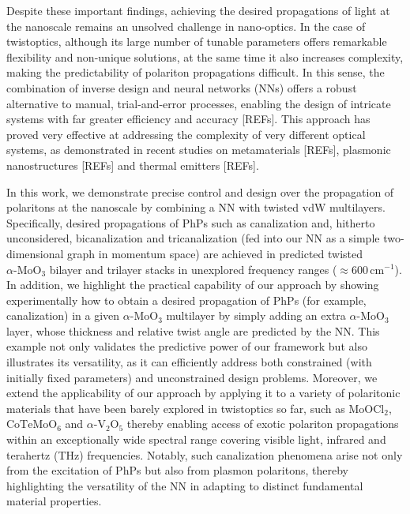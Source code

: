 Despite these important findings, achieving the desired propagations of light at the nanoscale remains an unsolved challenge in nano-optics. In the case of twistoptics, although its large number of tunable parameters offers remarkable flexibility and non-unique solutions, at the same time it also increases complexity, making the predictability of polariton propagations difficult. In this sense, the combination of inverse design and neural networks (NNs) offers a robust alternative to manual, trial-and-error processes, enabling the design of intricate systems with far greater efficiency and accuracy [REFs]. This approach has proved very effective at addressing the complexity of very different optical systems, as demonstrated in recent studies on metamaterials [REFs], plasmonic nanostructures [REFs] and thermal emitters [REFs].

In this work, we demonstrate precise control and design over the propagation of polaritons at the nanoscale by combining a NN with twisted vdW multilayers. Specifically, desired propagations of PhPs such as canalization and, hitherto unconsidered, bicanalization and tricanalization (fed into our NN as a simple two-dimensional graph in momentum space) are achieved in predicted twisted $\alpha\text{-}\mathrm{MoO}_3$ bilayer and trilayer stacks in unexplored frequency ranges ($\approx 600\,\mathrm{cm}^{-1}$). In addition, we highlight the practical capability of our approach by showing experimentally how to obtain a desired propagation of PhPs (for example, canalization) in a given $\alpha\text{-}\mathrm{MoO}_3$ multilayer by simply adding an extra $\alpha\text{-}\mathrm{MoO}_3$ layer, whose thickness and relative twist angle are predicted by the NN. This example not only validates the predictive power of our framework but also illustrates its versatility, as it can efficiently address both constrained (with initially fixed parameters) and unconstrained design problems. Moreover, we extend the applicability of our approach by applying it to a variety of polaritonic materials that have been barely explored in twistoptics so far, such as $\mathrm{MoOCl}_2$, $\mathrm{CoTeMoO}_6$ and $\alpha\text{-}\mathrm{V}_2\mathrm{O}_5$ thereby enabling access of exotic polariton propagations within an exceptionally wide spectral range covering visible light, infrared and terahertz (THz) frequencies. Notably, such canalization phenomena arise not only from the excitation of PhPs but also from plasmon polaritons, thereby highlighting the versatility of the NN in adapting to distinct fundamental material properties.

